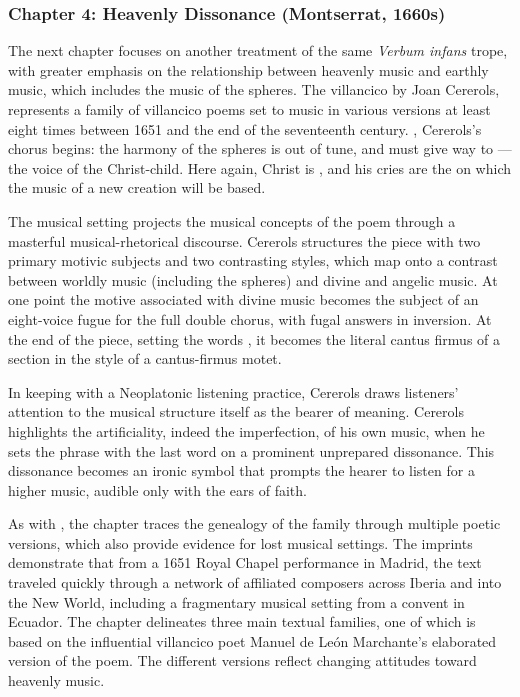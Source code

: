 \documentclass{vcbook-proposal}
\begin{document}
\subsubsection{Chapter 4: Heavenly Dissonance (Montserrat, 1660s)}

The next chapter focuses on another treatment of the same \emph{Verbum
infans} trope, with greater emphasis on the relationship between heavenly music
and earthly music, which includes the music of the spheres.
The villancico  by Joan Cererols, represents a
family of villancico poems set to music in various versions at least eight times
between 1651 and the end of the seventeenth century.
, Cererols's chorus begins:
the harmony of the spheres is out of tune, and must give 
way to ---the voice of the Christ-child.
Here again, Christ is , and his cries are the
 on which the music of a new creation will be based.

The musical setting projects the musical concepts of the poem through a 
masterful musical-rhetorical discourse.
Cererols structures the piece with two primary motivic subjects and two 
contrasting styles, which map onto a contrast between worldly music (including 
the spheres) and divine and angelic music. 
At one point the motive associated with divine music becomes the subject of an 
eight-voice fugue for the full double chorus, with fugal answers in inversion.
At the end of the piece, setting the words , it becomes the literal cantus firmus of a section in the style of a 
cantus-firmus motet.

In keeping with a Neoplatonic listening practice, Cererols draws listeners'
attention to the musical structure itself as the bearer of meaning.
Cererols highlights the artificiality, indeed the imperfection, of his own 
music, when he sets the phrase  with 
the last word on a prominent unprepared dissonance.
This dissonance becomes an ironic symbol that prompts the hearer to listen for 
a higher music, audible only with the ears of faith.

As with , the chapter traces the genealogy of the
 family through multiple poetic versions, which
also provide evidence for lost musical settings.
The imprints demonstrate that from a 1651 Royal Chapel performance in Madrid, 
the text traveled quickly through a network of affiliated composers across 
Iberia and into the New World, including a fragmentary musical setting from a 
convent in Ecuador.
The chapter delineates three main textual families, one of which is based on 
the influential villancico poet Manuel de León Marchante's elaborated version 
of the poem. 
The different versions reflect changing attitudes toward heavenly music.
\end{document}
